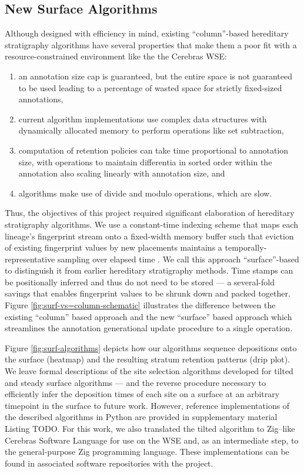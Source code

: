 \subsection{New Surface Algorithms}

Although designed with efficiency in mind, existing ``column''-based hereditary stratigraphy algorithms have several properties that make them a poor fit with a resource-constrained environment like the the Cerebras WSE:
\begin{enumerate}
\item an annotation size cap is guaranteed, but the entire space is not guaranteed to be used leading to a percentage of wasted space for strictly fixed-sized annotations,
\item current algorithm implementations use complex data structures with dynamically allocated memory to perform operations like set subtraction,
\item computation of retention policies can take time proportional to annotation size, with operations to maintain differentia in sorted order within the annotation also scaling linearly with annotation size, and
\item algorithms make use of divide and modulo operations, which are slow.
\end{enumerate}



Thus, the objectives of this project required significant elaboration of hereditary stratigraphy algorithms.
We use a constant-time indexing scheme that maps each lineage's fingerprint stream onto a fixed-width memory buffer such that eviction of existing fingerprint values by new placements maintains a temporally-representative sampling over elapsed time .
We call this approach ``surface''-based to distinguish it from earlier hereditary stratigraphy methods.
Time stamps can be positionally inferred and thus do not need to be stored --- a several-fold savings that enables fingerprint values to be shrunk down and packed together.
Figure \ref{fig:surf-vs=column-schematic} illustrates the difference between the existing ``column'' based approach and the new ``surface'' based approach which streamlines the annotation generational update procedure to a single operation.



Figure \ref{fig:surf-algorithms} depicts how our algorithms sequence depositions onto the surface (heatmap) and the resulting stratum retention patterns (drip plot).
We leave formal descriptions of the site selection algorithms developed for tilted and steady surface algorithms --- and the reverse procedure necessary to efficiently infer the deposition times of each site on a surface at an arbitrary timepoint in the surface to future work.
However, reference implementations of the described algorithms in Python are provided in supplementary material Listing TODO.
For this work, we also translated the tilted algorithm to Zig--like Cerebras Software Language for use on the WSE and, as an intermediate step, to the general-purpose Zig programming language.
These implementations can be found in associated software repositories with the project.

